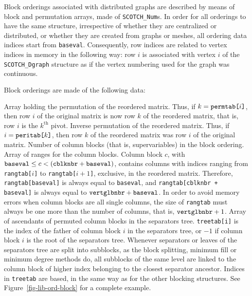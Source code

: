 Block orderings associated with distributed graphs are described by
means of block and permutation arrays, made of {\tt SCOTCH\_Num}s.  In
order for all orderings to have the same structure, irrespective of
whether they are centralized or distributed, or whether they are
created from graphs or meshes, all ordering data indices start from
{\tt baseval}. Consequently, row indices are related to vertex
indices in memory in the following way: row $i$ is associated with
vertex $i$ of the {\tt SCOTCH\_\lbt Dgraph} structure as if the vertex
numbering used for the graph was continuous.

Block orderings are made of the following data:
\begin{itemize}
\iteme[{\tt permtab}]
Array holding the permutation of the reordered matrix. Thus, if $k =
\mbox{\tt permtab}\mbox{\tt [}i\mbox{\tt ]}$, then row $i$ of the
original matrix is now row $k$ of the reordered matrix, that is, row
$i$ is the $k^{\mbox{th}}$ pivot.
\iteme[{\tt peritab}]
Inverse permutation of the reordered matrix. Thus, if $i = \mbox{\tt
peritab[$k$]}$, then row $k$ of the reordered matrix was row $i$ of
the original matrix.
\iteme[{\tt cblknbr}]
Number of column blocks (that is, supervariables) in the block ordering.
\iteme[{\tt rangtab}]
Array of ranges for the column blocks. Column block $c$, with
$\mbox{\tt baseval} \leq c < (\mbox{\tt cblknbr} + \mbox{\tt
baseval})$, contains columns with indices ranging from {\tt
rangtab[$i$]} to {\tt rangtab[$i + 1$]}, exclusive, in the reordered
matrix. Therefore,
{\tt rangtab[baseval]} is always equal to {\tt baseval}, and
{\tt rangtab[cblknbr + baseval]} is always equal to
$\mbox{\tt vert\lbt glb\lbt nbr} + \mbox{\tt baseval}$.
In order to avoid memory errors when column blocks are all single
columns, the size of {\tt rangtab} must always be one more than the
number of columns, that is, $\mbox{\tt vert\lbt glb\lbt nbr} + 1$.
\iteme[{\tt treetab}]
Array of ascendants of permuted column blocks in the separators tree.
{\tt treetab[i]} is the index of the father of column block $i$ in the
separators tree, or $-1$ if column block $i$ is the root of the
separators tree. Whenever separators or leaves of the separators tree
are split into subblocks, as the block splitting, minimum fill or minimum
degree methods do, all subblocks of the same level are linked to the
column block of higher index belonging to the closest separator
ancestor. Indices in {\tt treetab} are based, in the same way as for
the other blocking structures. See Figure~\ref{fig-lib-ord-block} for
a complete example.
\end{itemize}

